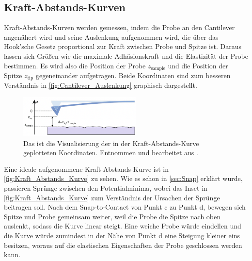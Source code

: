 \subsection{Kraft-Abstands-Kurven}
    Kraft-Abstands-Kurven werden gemessen, indem die Probe an den Cantilever angenähert wird und seine Auslenkung aufgenommen wird, die über das Hook'sche Gesetz proportional zur Kraft zwischen Probe und Spitze ist.
    Daraus lassen sich Größen wie die maximale Adhäsionskraft und die Elastizität der Probe bestimmen.
    Es wird also die Position der Probe $z_{\mathrm{sample}}$ und die Position der Spitze $z_{\mathrm{tip}}$ gegeneinander aufgetragen.
    Beide Koordinaten sind zum besseren Verständnis in \autoref{fig:Cantilever_Auslenkung} graphisch dargestellt.
    \begin{figure}[ht]
        \centering\captionsetup{format=plain}
        \includegraphics[width=0.55\textwidth]{bilder/Cantilever_Auslenkung.png}
        \caption{Das ist die Visualisierung der in der Kraft-Abstands-Kurve geplotteten Koordinaten. Entnommen und bearbeitet aus \cite{voigtlaender}.}
        \label{fig:Cantilever_Auslenkung}
    \end{figure}
    \FloatBarrier
    Eine ideale aufgenommene Kraft-Abstands-Kurve ist in \autoref{fig:Kraft_Abstands_Kurve} zu sehen.
    Wie es schon in \autoref{sec:Snap} erklärt wurde, passieren Sprünge zwischen den Potentialminima, wobei das Inset in \autoref{fig:Kraft_Abstands_Kurve} zum Verständnis der Ursachen der Sprünge beitragen soll.
    Nach dem Snap-to-Contact von Punkt c zu Punkt d, bewegen sich Spitze und Probe gemeinsam weiter, weil die Probe die Spitze nach oben auslenkt, sodass die Kurve linear steigt.
    Eine weiche Probe würde eindellen und die Kurve würde zumindest in der Nähe von Punkt d eine Steigung kleiner eins besitzen, woraus auf die elastischen Eigenschaften der Probe geschlossen werden kann.

